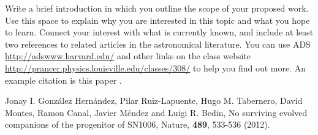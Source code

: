 \documentclass[a4paper]{article}
\begin{document}
Write a brief introduction in which you  outline the scope of your proposed
work. Use this space to explain why you are interested in this topic and what
you hope to learn. Connect your interest with what is currently known, and
include at least two references to related articles in the astronomical
literature.  You can use ADS  \url{http://adswww.harvard.edu/} and other links
on the class website \url{http://prancer.physics.louisville.edu/classes/308/} 
to help you find out more. An example citation is this paper
\cite{gonzalez2012}.

\begin{thebibliography}{99}

 Jonay I. Gonz\'{a}lez Hern\'{a}ndez, 
Pilar Ruiz-Lapuente,	
Hugo M. Tabernero,	
David Montes,	
Ramon Canal,	
Javier M\'{e}ndez	
and Luigi R. Bedin,
{No surviving evolved companions of the progenitor of SN1006},
Nature, {\bf 489}, 533-536 (2012).

\end{thebibliography}
\end{document}
